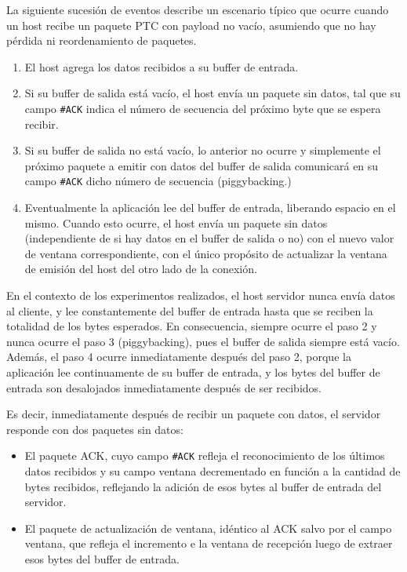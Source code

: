 \documentclass[a4paper, 10pt, twoside]{article}
\newcommand{\ack}{\texttt{\#ACK}\xspace}
\begin{document}
La siguiente sucesión de eventos describe un escenario típico que ocurre cuando un host recibe un paquete PTC con payload no vacío, asumiendo que no hay pérdida ni reordenamiento de paquetes.

\begin{enumerate}
  \item El host agrega los datos recibidos a su buffer de entrada.
  
  \item Si su buffer de salida está vacío, el host envía un paquete sin datos, tal que su campo \ack indica el número de secuencia del próximo byte que se espera recibir.
  
  \item Si su buffer de salida no está vacío, lo anterior no ocurre y simplemente el próximo paquete a emitir con datos del buffer de salida comunicará en su campo \ack dicho número de secuencia (piggybacking.)
  
  \item Eventualmente la aplicación lee del buffer de entrada, liberando espacio en el mismo. Cuando esto ocurre, el host envía un paquete sin datos (independiente de si hay datos en el buffer de salida o no) con el nuevo valor de ventana correspondiente, con el único propósito de actualizar la ventana de emisión del host del otro lado de la conexión.
\end{enumerate}

En el contexto de los experimentos realizados, el host servidor nunca envía datos al cliente, y lee constantemente del buffer de entrada hasta que se reciben la totalidad de los bytes esperados. En consecuencia, siempre ocurre el paso 2 y nunca ocurre el paso 3 (piggybacking), pues el buffer de salida siempre está vacío. Además, el paso 4 ocurre inmediatamente después del paso 2, porque la aplicación lee continuamente de su buffer de entrada, y los bytes del buffer de entrada son desalojados inmediatamente después de ser recibidos.

Es decir, inmediatamente después de recibir un paquete con datos, el servidor responde con dos paquetes sin datos:

\begin{itemize}
  \item El paquete ACK, cuyo campo \ack refleja el reconocimiento de los últimos datos recibidos y su campo ventana decrementado en función a la cantidad de bytes recibidos, reflejando la adición de esos bytes al buffer de entrada del servidor.

  \item El paquete de actualización de ventana, idéntico al ACK salvo por el campo ventana, que refleja el incremento e la ventana de recepción luego de extraer esos bytes del buffer de entrada.
\end{itemize}
\end{document}
